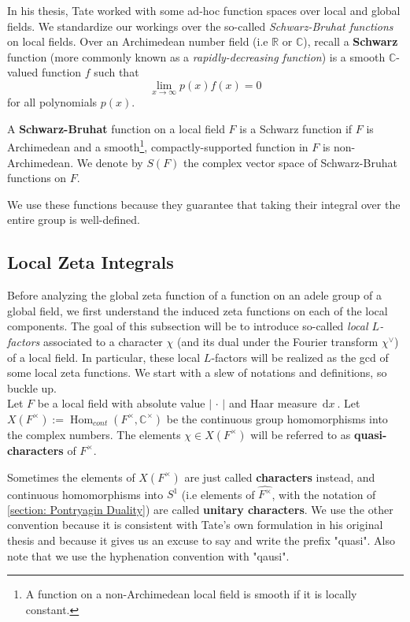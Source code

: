 \documentclass[11pt, x11names, openany]{book}
\newcommand{\rr}{\mathbb{R}}
\newcommand{\cc}{\mathbb{C}}
\newcommand{\abs}[1]{\left| \, #1  \,\right|}
\renewcommand{\hat}{\widehat}
\DeclareMathOperator{\Hom}{Hom}
\newcommand{\dx}{\, \mathrm{d}x \ }
\begin{document}
In his thesis, Tate worked with some ad-hoc function spaces over local and global fields. We standardize our workings over the so-called \textit{Schwarz-Bruhat functions} on local fields. Over an Archimedean number field (i.e $\rr$ or $\cc$), recall a \textbf{Schwarz} function (more commonly known as a \textit{rapidly-decreasing function}) is a smooth $\cc$-valued function $f$ such that
\begin{equation*}
    \lim_{x \to \infty} p(x)f(x) = 0
\end{equation*}
for all polynomials $p(x)$.
\begin{defn}
\label{def: Schwarz-Bruhat functions}
A \textbf{Schwarz-Bruhat} function on a local field $F$ is a Schwarz function if $F$ is Archimedean and a smooth\footnote{A function on a non-Archimedean local field is smooth if it is locally constant.}, compactly-supported function in $F$ is non-Archimedean. We denote by $S(F)$ the complex vector space of Schwarz-Bruhat functions on $F$.
\end{defn}
We use these functions because they guarantee that taking their integral over the entire group is well-defined.

\subsection{Local Zeta Integrals}
Before analyzing the global zeta function of a function on an adele group of a global field, we first understand the induced zeta functions on each of the local components. The goal of this subsection will be to introduce so-called \textit{local $L$-factors} associated to a character $\chi$ (and its dual under the Fourier transform $\chi^\lor$) of a local field. In particular, these local $L$-factors will be realized as the gcd of some local zeta functions. We start with a slew of notations and definitions, so buckle up.\\

Let $F$ be a local field with absolute value $\abs{\cdot}$ and Haar measure $\dx$.
Let $X(F^\times) := \Hom_{cont}(F^\times, \cc^\times)$ be the continuous group homomorphisms into the complex numbers. The elements $\chi \in X(F^\times)$ will be referred to as \textbf{quasi-characters} of $F^\times$.
\begin{remark}
    Sometimes the elements of $X(F^\times)$ are just called \textbf{characters} instead, and continuous homomorphisms into $S^1$ (i.e elements of $\hat{F^\times}$, with the notation of \ref{section: Pontryagin Duality}) are called \textbf{unitary characters}. We use the other convention because it is consistent with Tate's own formulation in his original thesis and because it gives us an excuse to say and write the prefix "quasi". Also note that we use the hyphenation convention with "qausi".
\end{remark}
\end{document}
